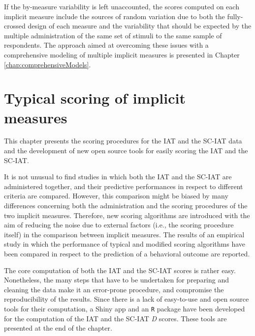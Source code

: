 \documentclass[12pt]{book}
\begin{document}
If the by-measure variability is left unaccounted, the scores computed on each implicit measure include the sources of random variation due to both the fully-crossed design of each measure and the variability that should be expected by the multiple administration of the same set of stimuli to the same sample of respondents. 
The approach aimed at overcoming these issues with a comprehensive modeling of multiple implicit measures is presented in Chapter \ref{chap:comprehensiveModels}.

\chapter{Typical scoring of implicit measures}\label{chap:classicscore}
This chapter presents the scoring procedures for the IAT and the SC-IAT data and the development of new open source tools for easily scoring the IAT and the SC-IAT.

It is not unusual to find studies in which both the IAT and the SC-IAT are administered together, and their predictive performances in respect to different criteria are compared. 
However, this comparison might be biased by many differences concerning both the administration and the scoring procedures of the two implicit measures. 
Therefore, new scoring algorithms are introduced with the aim of reducing the noise due to external factors (i.e., the scoring procedure itself) in the comparison between implicit measures. 
The results of an empirical study in which the performance of typical and modified scoring algorithms have been compared in respect to the prediction of a behavioral outcome are reported.

The core computation of both the IAT and the SC-IAT scores is rather easy. Nonetheless, the many steps that have to be undertaken for preparing and cleaning the data make it an error-prone procedure, and compromise the reproducibility of the results. Since there is a lack of easy-to-use and open source tools for their computation, a Shiny app and an \verb*|R| package have been developed for the computation of the IAT and the SC-IAT \emph{D} scores. These tools are presented at the end of the chapter.
\end{document}
